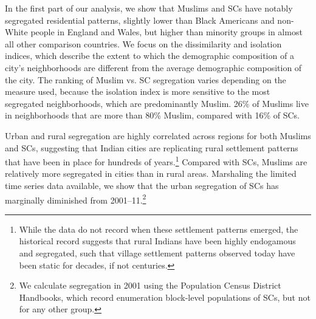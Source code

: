 \documentclass[12pt]{article}
\begin{document}


In the first part of our analysis, we show that Muslims and SCs have notably segregated residential patterns, slightly lower than Black Americans and non-White people in England and Wales, but higher than minority groups in almost all other comparison countries. We focus on the dissimilarity and isolation indices, which describe the extent to which the demographic composition of a city's neighborhoods are different from the average demographic composition of the city. The ranking of Muslim vs. SC segregation varies depending on the measure used, because the isolation index is more sensitive to the most segregated neighborhoods, which are predominantly Muslim. 26\% of Muslims live in neighborhoods that are more than 80\% Muslim, compared with 16\% of SCs.

Urban and rural segregation are highly correlated across regions for both Muslims and SCs, suggesting that Indian cities are replicating rural settlement patterns that have been in place for hundreds of years.\footnote{While the data do not record when these settlement patterns emerged, the historical record suggests that rural Indians have been highly endogamous and segregated, such that village settlement patterns observed today have been static for decades, if not centuries.} Compared with SCs, Muslims are relatively more segregated in cities than in rural areas. Marshaling the limited time series data available, we show that the urban segregation of SCs has marginally diminished from 2001--11.\footnote{We calculate segregation in 2001 using the Population Census District Handbooks, which record enumeration block-level populations of SCs, but not for any other group.}
\end{document}
